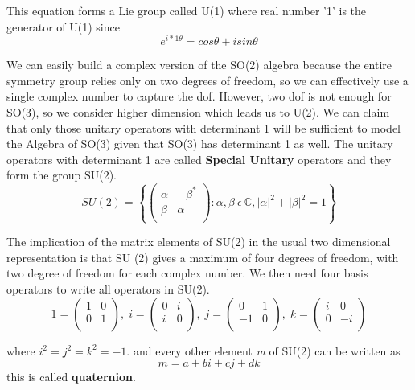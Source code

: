 This equation forms a Lie group called U(1) where real number '1' is the generator of U(1) since
\begin{equation}
    e^{i*1\theta} = cos\theta + i sin\theta
\end{equation}

We can easily build a complex version of the SO(2) algebra because the entire symmetry group relies only on two degrees of freedom, 
so we can effectively use a single complex number to capture the dof. 
However, two dof is not enough for SO(3), so we consider higher dimension which leads us to U(2).
We can claim that only those unitary operators with determinant 1 will be sufficient to model the Algebra of SO(3) given that SO(3) has determinant 1 as well.
The unitary operators with determinant 1 are called \textbf{Special Unitary} operators and they form the group SU(2).
\begin{equation}
    SU(2) = \left\{
        \begin{pmatrix}
        \alpha & -\beta^* \\ 
        \beta & \alpha \\ 
    \end{pmatrix}: 
    \alpha, \beta \: \epsilon \: \mathbb{C}, |\alpha|^2+|\beta|^2=1
    \right\}
\end{equation}

The implication of the matrix elements of SU(2) in the usual two dimensional representation is that SU (2)
gives a maximum of four degrees of freedom, with two degree of freedom for each complex number. We then
need four basis operators to write all operators in SU(2). 
\begin{equation}
    1 = \begin{pmatrix}
        1 & 0 \\ 
        0 & 1 \\ 
    \end{pmatrix}, \;
    i = \begin{pmatrix}
        0 & i \\ 
        i & 0 \\ 
    \end{pmatrix}, \; 
    j = \begin{pmatrix}
        0 & 1 \\ 
        -1 & 0 \\ 
    \end{pmatrix}, \;
    k = \begin{pmatrix}
        i & 0 \\ 
        0 & -i \\ 
    \end{pmatrix}
\end{equation}

where $i^2 = j^2 = k^2 = -1$.
and every other element \textit{m} of SU(2) can be written as
\begin{equation}
    m = a + bi + cj + dk
\end{equation}
this is called \textbf{quaternion}.

\newpage
